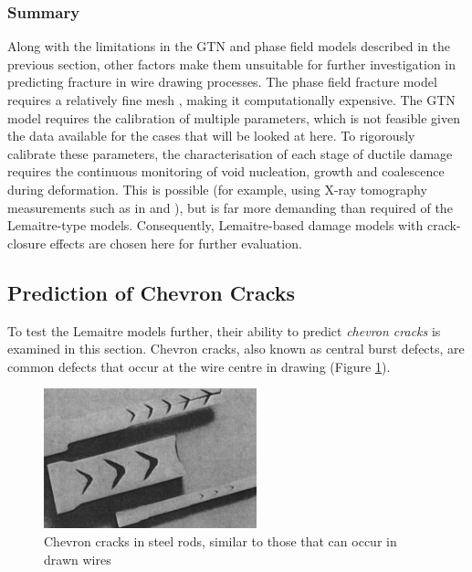 \documentclass[sn-mathphys,Numbered]{sn-jnl}%
\begin{document}
\subsubsection{Summary}
Along with the limitations in the GTN and phase field models described in the previous section, other factors make them unsuitable for further investigation in predicting fracture in wire drawing processes.
The phase field fracture model requires a relatively fine mesh \cite{borden_phase-field_2016}, making it computationally expensive. The GTN model requires the calibration of multiple parameters, which is not feasible given the data available for the cases that will be looked at here.
To rigorously calibrate these parameters, the characterisation of each stage of ductile damage requires the continuous monitoring of void nucleation, growth and coalescence during deformation.
This is possible (for example, using X-ray tomography measurements such as in \citet{thuillier_ductile_2012} and \citet{fansi_numerical_2013}), but is far more demanding than required of the Lemaitre-type models.
Consequently, Lemaitre-based damage models with crack-closure effects are chosen here for further evaluation.


\subsection{Prediction of Chevron Cracks} \label{sec:chevron_cracks}
To test the Lemaitre models further, their ability to predict \emph{chevron cracks} is examined in this section.
Chevron cracks, also known as central burst defects, are common defects that occur at the wire centre in drawing (Figure \ref{fig:chevronCracks}).
\begin{figure}[htb]
\begin{center}
	\includegraphics[width=0.55\textwidth]{./Figures/finiteVolumeCharacteristics/chevronCracked.png}
	\caption{Chevron cracks in steel rods, similar to those that can occur in drawn wires \cite{krauss_steels_2015}}
	\label{fig:chevronCracks}
\end{center}
\end{figure}
\end{document}
